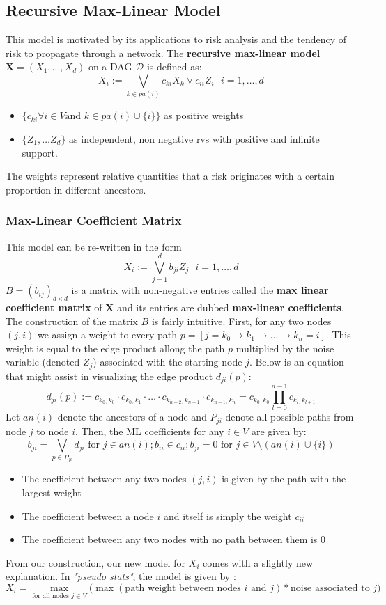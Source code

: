 \documentclass[12pt]{article}
\def\x{\mathbf{X}}
\newcommand{\ds}{\displaystyle}
\theoremstyle{definition}
\theoremstyle{definition}
\begin{document}
\subsection{Recursive Max-Linear Model}
 This model is motivated by its applications to risk analysis and the tendency of risk to propagate through a network. The \textbf{recursive max-linear model} $\x=(X_1,\hdots, X_d)$ on a DAG $\mathcal{D}$ is defined as:
$$X_i:= \bigvee_{k\in pa(i)}c_{ki}X_k \vee c_{ii}Z_i\ \ \  i=1,\hdots,d$$
\begin{itemize}
    \item $\ds \{c_{ki} \forall i \in V \text{and } k \in pa(i)\cup\{i\}\}$ as positive weights 
    \item $\{Z_1, \hdots Z_d\}$ as independent, non negative rvs with positive and infinite support.
\end{itemize}
The weights represent relative quantities that a risk originates with a certain proportion in different ancestors.

\subsubsection{Max-Linear Coefficient Matrix}
\noindent This model can be re-written in the form $$X_i:= \bigvee_{j=1}^db_{ji}Z_j\ \ \  i=1,\hdots,d$$
$B=(b_{ij})_{d\times d}$ is a matrix with non-negative entries called the \textbf{max linear coefficient matrix} of $\x$ and its entries are dubbed \textbf{max-linear coefficients}. The construction of the matrix $B$ is fairly intuitive. First, for any two nodes $(j,i)$ we assign a weight to every path $p= [j=k_0\rightarrow k_1\rightarrow \hdots \rightarrow k_n=i]$. This weight is equal to the edge product allong the path $p$ multiplied by the noise variable (denoted $Z_j$) associated with the starting node $j$. Below is an equation that might assist in visualizing the edge product $d_{ji}(p)$:
$$d_{ji}(p):=c_{k_0,k_0}\cdot c_{k_0,k_1}\cdot\hdots\cdot c_{k_{n-2},k_{n-1}}\cdot c_{k_{n-1},k_n}=c_{k_0,k_0}\prod_{l=0}^{n-1}c_{k_l,k_{l+1}}$$
Let $an(i)$ denote the ancestors of a node and $P_{ji}$ denote all possible paths from node $j$ to node $i$. Then, the ML coefficients for any $i\in V$ are given by:
$$b_{ji}=\bigvee_{p\in P_{ji}}d_{ji} \text{ for }j\in an(i);b_{ii}\in c_{ii}; b_{ji}=0 \text{ for } j \in V \setminus (an(i)\cup \{i\})$$
\begin{itemize}
    \item The coefficient between any two nodes $(j,i)$ is given by the path with the largest weight
    \item The coefficient between a node $i$ and itself is simply the weight $c_{ii}$
    \item The coefficient between any two nodes with no path between them is $0$
\end{itemize}
From our construction, our new model for $X_i$ comes with a slightly new explanation. In \textit{"pseudo stats"}, the model is given by :
$$X_i=\max_{\text{for all nodes }j\in V}\bigg( \max(\text{path weight between nodes }i \text{ and }j ) * \text{noise associated to }j\bigg) $$
\pagebreak
\end{document}
